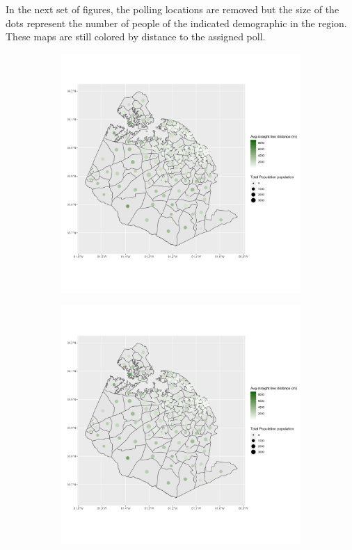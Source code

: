 \documentclass[11pt]{article}
\theoremstyle{remark}
\theoremstyle{definition}
\begin{document}
In the next set of figures, the polling locations are removed but the size of the dots represent the number of people of the indicated demographic in the region. These maps are still colored by distance to the assigned poll.

\begin{figure}
	\begin{subfigure}{.5\textwidth}
		\centering
		\includegraphics[width=\linewidth]{result analysis/Lexington_SC_original_configs/population_pop_and_dist_Lexington_config_original_2016_polls.png}
		\label{sfig:York_2016_bg_dist_pop}
	\end{subfigure} 
	\begin{subfigure}{.5\textwidth}
		\centering
		\includegraphics[width=\linewidth]{result analysis/Lexington_SC_original_configs/population_pop_and_dist_Lexington_config_original_2022_polls.png}

\end{subfigure}
\end{figure}
\end{document}
